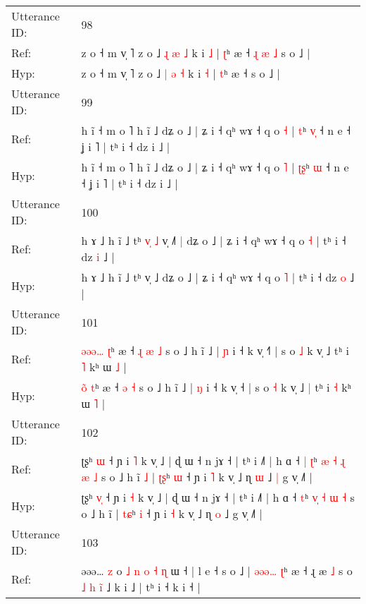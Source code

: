 \documentclass[10pt]{article}
\DeclareRobustCommand{\hl}[1]{{\textcolor{red}{#1}}}
\begin{document}
\begin{longtable}{ll}
 \\
\midrule
Utterance ID: & 98 \\
Ref: & z o ˧ m v̩ ˥ z o ˩ \hl{ɻ} \hl{æ} \hl{˩} k i \hl{˩} | \hl{ʈ}ʰ æ ˧\hl{ }\hl{ɻ}\hl{ }\hl{æ}\hl{ }\hl{˩} s o ˩ |
 \\
Hyp: & z o ˧ m v̩ ˥ z o ˩ \hl{|} \hl{ə} \hl{˧} k i \hl{˧} | \hl{t}ʰ æ ˧\hl{}\hl{}\hl{}\hl{}\hl{}\hl{} s o ˩ |
 \\
\midrule
Utterance ID: & 99 \\
Ref: & h ĩ ˧ m o ˥ h ĩ ˩ dʑ o ˩ | ʑ i ˧ qʰ wɤ ˧ q o \hl{˧} | \hl{}\hl{t}ʰ \hl{v}\hl{̩} ˧ n e ˧ ʝ i ˥ | tʰ i ˧ dz i ˩ |
 \\
Hyp: & h ĩ ˧ m o ˥ h ĩ ˩ dʑ o ˩ | ʑ i ˧ qʰ wɤ ˧ q o \hl{˥} | \hl{ʈ}\hl{ʂ}ʰ \hl{}\hl{ɯ} ˧ n e ˧ ʝ i ˥ | tʰ i ˧ dz i ˩ |
 \\
\midrule
Utterance ID: & 100 \\
Ref: & h ɤ ˩ h ĩ ˩ tʰ\hl{ }\hl{v}\hl{̩}\hl{ }\hl{˩} v̩ ˩\hl{˥}\hl{ }\hl{|} dʑ o ˩ | ʑ i ˧ qʰ wɤ ˧ q o \hl{˧} | tʰ i ˧ dz \hl{i} ˩ |
 \\
Hyp: & h ɤ ˩ h ĩ ˩ tʰ\hl{}\hl{}\hl{}\hl{}\hl{} v̩ ˩\hl{}\hl{}\hl{} dʑ o ˩ | ʑ i ˧ qʰ wɤ ˧ q o \hl{˥} | tʰ i ˧ dz \hl{o} ˩ |
 \\
\midrule
Utterance ID: & 101 \\
Ref: & \hl{ə}\hl{ə}\hl{ə}\hl{…} \hl{ʈ}ʰ æ ˧\hl{ }\hl{ɻ} \hl{æ} \hl{˩} s o ˩ h ĩ ˩ | \hl{ɲ} i ˧ k v̩ ˧\hl{˥} | s o \hl{˩} k v̩ ˩\hl{}\hl{} tʰ i \hl{˥} kʰ ɯ \hl{˩} |
 \\
Hyp: & \hl{}\hl{}\hl{o}\hl{̃} \hl{t}ʰ æ ˧\hl{}\hl{} \hl{ə} \hl{˧} s o ˩ h ĩ ˩ | \hl{ŋ} i ˧ k v̩ ˧\hl{} | s o \hl{˧} k v̩ ˩\hl{ }\hl{|} tʰ i \hl{˧} kʰ ɯ \hl{˥} |
 \\
\midrule
Utterance ID: & 102 \\
Ref: & ʈʂʰ \hl{}\hl{ɯ} ˧ ɲ i \hl{˥} k v̩ ˩ | ɖ ɯ ˧ n jɤ ˧ | tʰ i ˩˥ | h ɑ ˧\hl{ }\hl{|} \hl{ʈ}ʰ \hl{æ}\hl{ }\hl{˧} \hl{ɻ} \hl{æ} \hl{˩} s o ˩ h ĩ\hl{ }\hl{˩} | \hl{ʈ}\hl{ʂ}ʰ \hl{ɯ} ˧ ɲ i \hl{˥} k v̩ ˩ ɳ \hl{ɯ} ˩\hl{ }\hl{|} g v̩ ˩˥ |
 \\
Hyp: & ʈʂʰ \hl{v}\hl{̩} ˧ ɲ i \hl{˧} k v̩ ˩ | ɖ ɯ ˧ n jɤ ˧ | tʰ i ˩˥ | h ɑ ˧\hl{}\hl{} \hl{t}ʰ \hl{}\hl{v}\hl{̩} \hl{˧} \hl{ɯ} \hl{˧} s o ˩ h ĩ\hl{}\hl{} | \hl{t}\hl{ɕ}ʰ \hl{i} ˧ ɲ i \hl{˧} k v̩ ˩ ɳ \hl{o} ˩\hl{}\hl{} g v̩ ˩˥ |
 \\
\midrule
Utterance ID: & 103 \\
Ref: & əəə… \hl{z} o \hl{˩} \hl{n} \hl{}\hl{o} \hl{˧} \hl{ɳ} ɯ ˧ | l e ˧ s o ˩ |\hl{ }\hl{ə}\hl{ə}\hl{ə}\hl{…} \hl{ʈ}ʰ æ ˧ ɻ æ \hl{˩} s o\hl{ }\hl{˩}\hl{ }\hl{h}\hl{ }\hl{i}\hl{̃} ˩ k i ˩ | tʰ i ˧ k i ˧ |

\end{longtable}
\end{document}
